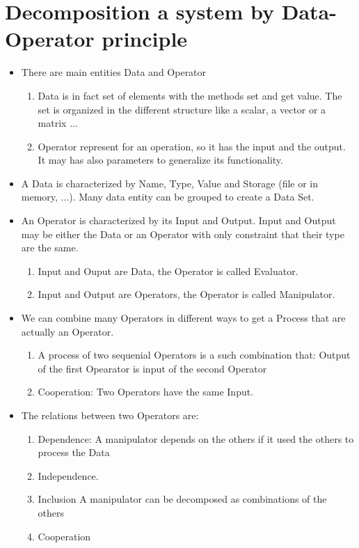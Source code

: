 \documentclass{report}
\begin{document}
\section{Decomposition a system by Data-Operator principle}
\begin{itemize}
\item There are main entities Data and Operator
  \begin{enumerate}
  \item Data is in fact set of elements with the methods set and get value. The 
    set is organized in the different structure like a scalar, a vector or a matrix ...
  \item Operator represent for an operation, so it has  the input and the output.
    It may has also parameters to generalize its functionality.
  \end{enumerate}
\item A Data is characterized by Name, Type, Value and Storage (file or in memory, ...). Many data entity 
  can be grouped to create a Data Set.
\item An Operator is characterized by its Input and Output. Input and Output may be either the Data or an Operator with
  only constraint that their type are the same. 
  \begin{enumerate}
  \item Input and Ouput are Data, the Operator is called Evaluator. 
  \item Input and Output are Operators, the Operator is called Manipulator. 
  \end{enumerate}
\item We can combine many Operators in different ways to get a Process that are actually 
  an Operator.
  \begin{enumerate}
  \item A process of two sequenial Operators is a such combination that: Output of the first Opearator is input 
    of the second Operator
  \item Cooperation: Two Operators have the same Input.
  \end{enumerate}
\item The relations between two Operators are:
  \begin{enumerate}
  \item Dependence: A manipulator depends on the others if it used the others to process 
    the Data
  \item Independence.
  \item Inclusion A manipulator can be decomposed as combinations of the others
  \item Cooperation
  \end{enumerate}
\end{itemize}
\end{document}
